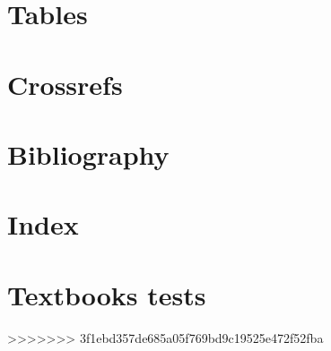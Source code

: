 \documentclass[output=book
	      ,nonflat
	      ,modfonts
	      ]{langsci/langscibook}
\begin{document}
\section{Tables}\label{sec:tables}

\section{Crossrefs}

\section{Bibliography}
 
\section{Index}
 
%  


%  
 
%  
%  
\section{Textbooks tests}
 
 

 
>>>>>>> 3f1ebd357de685a05f769bd9c19525e472f52fba

\end{document}
